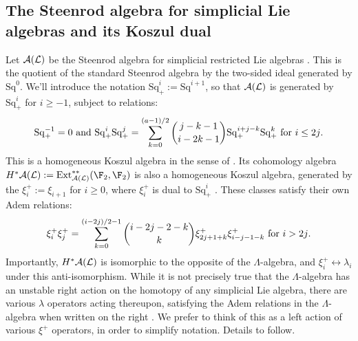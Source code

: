 \documentclass[11pt]{article}
\newcommand{\LambdaOp}{\xi^{+}}
\newcommand{\SqShift}{\Sq_{+}}
\newcommand{\Sq}{\mathrm{Sq}}
\newcommand{\LieSteen}{\calA(\calL)}
\begin{document}
\begin{SteenrodAlgebrasAndTheirKoszulDuals}
\subsection*{The Steenrod algebra for simplicial Lie algebras and its Koszul dual}
Let  $\LieSteen$ be the Steenrod algebra for simplicial restricted Lie algebras \cite[\S7]{PriddySimplicialLie.pdf}. This is the quotient of the standard Steenrod algebra by the two-sided ideal generated by $\Sq^0$. We'll introduce the notation $\SqShift^i:=\Sq^{i+1}$, so that $\LieSteen$ is generated by $\SqShift^i$ for $i\geq-1$, subject to relations:
\[\SqShift^{-1}=0\textup{ and }\SqShift^i\SqShift^j=\sum_{k=0}^{(a-1)/2}{j-k-1\choose i-2k-1}\SqShift^{i+j-k}\SqShift^k\textup{\ for $i\leq2j$.}\]
This is a homogeneous Koszul algebra in the sense of \cite{PriddyKoszul.pdf}. Its cohomology algebra $H^*\LieSteen:=\Ext_{\LieSteen}^{**}(\F_2,\F_2)$ is also a homogeneous Koszul algebra, generated by the $\LambdaOp_i:=\xi_{i+1}$ for $i\geq0$, where $\LambdaOp_i$ is dual to $\SqShift^i$ \cite[\S8]{PriddySimplicialLie.pdf}. These classes satisfy their own Adem relations:
\[\LambdaOp_i\LambdaOp_j=\sum_{k=0}^{(i-2j)/2-1}{i-2j-2-k\choose k}\LambdaOp_{2j+1+k}\LambdaOp_{i-j-1-k}\textup{\ for $i>2j$.}\]
Importantly, $H^*\LieSteen$ is isomorphic to the opposite of the $\Lambda$-algebra, and $\LambdaOp_i\longleftrightarrow\lambda_i$ under this anti-isomorphism. While it is not precisely true that the $\Lambda$-algebra has an unstable right action on the homotopy of any simplicial Lie algebra, there are various $\lambda$ operators acting thereupon, satisfying the Adem relations in the $\Lambda$-algebra when written on the right \cite[Prop 8.6]{CurtisSimplicialHtpy.pdf}. We prefer to think of this as a left action of various $\LambdaOp$ operators, in order to simplify notation. Details to follow.


\end{SteenrodAlgebrasAndTheirKoszulDuals}
\end{document}
